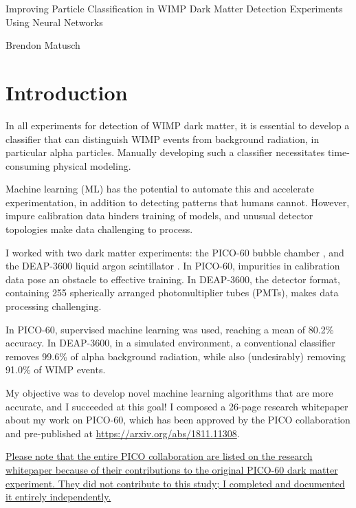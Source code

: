 \documentclass[12pt]{article}
\begin{document}
\begin{center}
    \begin{LARGE}
        Improving Particle Classification in WIMP Dark Matter Detection Experiments Using Neural Networks
    \end{LARGE}

    Brendon Matusch
\end{center}

\section{Introduction}

In all experiments for detection of WIMP dark matter, it is essential to develop a classifier that can distinguish WIMP events from background radiation, in particular alpha particles. Manually developing such a classifier necessitates time-consuming physical modeling.

Machine learning (ML) has the potential to automate this and accelerate experimentation, in addition to detecting patterns that humans cannot. However, impure calibration data hinders training of models, and unusual detector topologies make data challenging to process.

I worked with two dark matter experiments: the PICO-60 bubble chamber \cite{pico}, and the DEAP-3600 liquid argon scintillator \cite{deap}. In PICO-60, impurities in calibration data pose an obstacle to effective training. In DEAP-3600, the detector format, containing 255 spherically arranged photomultiplier tubes (PMTs), makes data processing challenging.

In PICO-60, supervised machine learning was used, reaching a mean of 80.2\% accuracy. In DEAP-3600, in a simulated environment, a conventional classifier removes 99.6\% of alpha background radiation, while also (undesirably) removing 91.0\% of WIMP events.

My objective was to develop novel machine learning algorithms that are more accurate, and I succeeded at this goal! I composed a 26-page research whitepaper \cite{me} about my work on PICO-60, which has been approved by the PICO collaboration and pre-published at \url{https://arxiv.org/abs/1811.11308}.

\ul{Please note that the entire PICO collaboration are listed on the research whitepaper because of their contributions to the original PICO-60 dark matter experiment. They did not contribute to this study; I completed and documented it entirely independently.}
\end{document}
